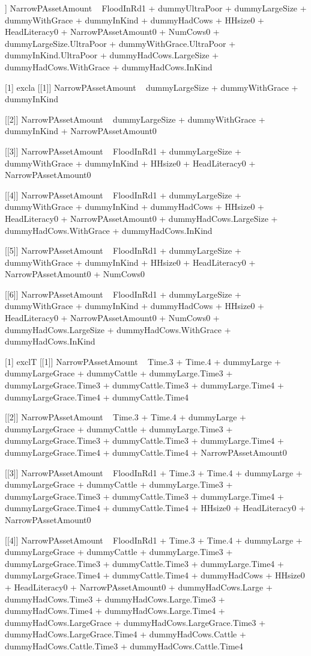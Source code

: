 \begin{Schunk}
\begin{Soutput}
[[6]]
NarrowPAssetAmount ~ FloodInRd1 + dummyUltraPoor + dummyLargeSize + 
    dummyWithGrace + dummyInKind + dummyHadCows + HHsize0 + HeadLiteracy0 + 
    NarrowPAssetAmount0 + NumCows0 + dummyLargeSize.UltraPoor + 
    dummyWithGrace.UltraPoor + dummyInKind.UltraPoor + dummyHadCows.LargeSize + 
    dummyHadCows.WithGrace + dummyHadCows.InKind

[1] excla
[[1]]
NarrowPAssetAmount ~ dummyLargeSize + dummyWithGrace + dummyInKind

[[2]]
NarrowPAssetAmount ~ dummyLargeSize + dummyWithGrace + dummyInKind + 
    NarrowPAssetAmount0

[[3]]
NarrowPAssetAmount ~ FloodInRd1 + dummyLargeSize + dummyWithGrace + 
    dummyInKind + HHsize0 + HeadLiteracy0 + NarrowPAssetAmount0

[[4]]
NarrowPAssetAmount ~ FloodInRd1 + dummyLargeSize + dummyWithGrace + 
    dummyInKind + dummyHadCows + HHsize0 + HeadLiteracy0 + NarrowPAssetAmount0 + 
    dummyHadCows.LargeSize + dummyHadCows.WithGrace + dummyHadCows.InKind

[[5]]
NarrowPAssetAmount ~ FloodInRd1 + dummyLargeSize + dummyWithGrace + 
    dummyInKind + HHsize0 + HeadLiteracy0 + NarrowPAssetAmount0 + 
    NumCows0

[[6]]
NarrowPAssetAmount ~ FloodInRd1 + dummyLargeSize + dummyWithGrace + 
    dummyInKind + dummyHadCows + HHsize0 + HeadLiteracy0 + NarrowPAssetAmount0 + 
    NumCows0 + dummyHadCows.LargeSize + dummyHadCows.WithGrace + 
    dummyHadCows.InKind

[1] exclT
[[1]]
NarrowPAssetAmount ~ Time.3 + Time.4 + dummyLarge + dummyLargeGrace + 
    dummyCattle + dummyLarge.Time3 + dummyLargeGrace.Time3 + 
    dummyCattle.Time3 + dummyLarge.Time4 + dummyLargeGrace.Time4 + 
    dummyCattle.Time4

[[2]]
NarrowPAssetAmount ~ Time.3 + Time.4 + dummyLarge + dummyLargeGrace + 
    dummyCattle + dummyLarge.Time3 + dummyLargeGrace.Time3 + 
    dummyCattle.Time3 + dummyLarge.Time4 + dummyLargeGrace.Time4 + 
    dummyCattle.Time4 + NarrowPAssetAmount0

[[3]]
NarrowPAssetAmount ~ FloodInRd1 + Time.3 + Time.4 + dummyLarge + 
    dummyLargeGrace + dummyCattle + dummyLarge.Time3 + dummyLargeGrace.Time3 + 
    dummyCattle.Time3 + dummyLarge.Time4 + dummyLargeGrace.Time4 + 
    dummyCattle.Time4 + HHsize0 + HeadLiteracy0 + NarrowPAssetAmount0

[[4]]
NarrowPAssetAmount ~ FloodInRd1 + Time.3 + Time.4 + dummyLarge + 
    dummyLargeGrace + dummyCattle + dummyLarge.Time3 + dummyLargeGrace.Time3 + 
    dummyCattle.Time3 + dummyLarge.Time4 + dummyLargeGrace.Time4 + 
    dummyCattle.Time4 + dummyHadCows + HHsize0 + HeadLiteracy0 + 
    NarrowPAssetAmount0 + dummyHadCows.Large + dummyHadCows.Time3 + 
    dummyHadCows.Large.Time3 + dummyHadCows.Time4 + dummyHadCows.Large.Time4 + 
    dummyHadCows.LargeGrace + dummyHadCows.LargeGrace.Time3 + 
    dummyHadCows.LargeGrace.Time4 + dummyHadCows.Cattle + dummyHadCows.Cattle.Time3 + 
    dummyHadCows.Cattle.Time4


\end{Soutput}
\end{Schunk}
